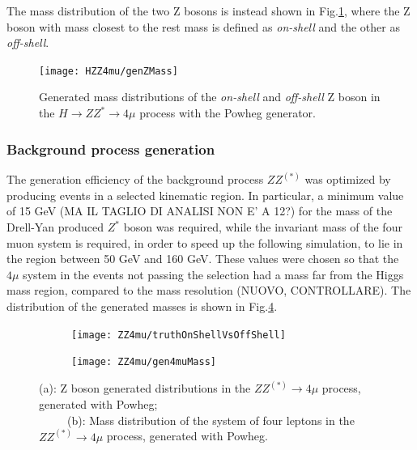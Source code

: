\documentclass[a4paper,twoside,12pt]{article}
\begin{document}
The mass distribution of the two Z bosons is instead shown in Fig.\ref{fig:HZZ4mu:generatedZMass}, where the Z boson with mass closest to the rest mass
is defined as \textit{on-shell} and the other as \textit{off-shell}.

\begin{figure}
\centering
  \texttt{[image: HZZ4mu/genZMass]}
  \caption{Generated mass distributions of the \textit{on-shell} and \textit{off-shell} Z boson 
  in the $H \rightarrow ZZ^* \rightarrow 4\mu$ process with the Powheg generator.}
\label{fig:HZZ4mu:generatedZMass}
\end{figure}

\subsubsection{Background process generation}\label{physics:bkgGeneration}
The generation efficiency of the background process $ZZ^{(*)}$ was optimized by
producing events in a selected kinematic region. In particular, a minimum value of 15 GeV (MA IL TAGLIO DI ANALISI NON E' A 12?) for the mass of
the Drell-Yan produced $Z^*$ boson was required, while the invariant mass of the four muon system is required,
in order to speed up the following simulation, 
to lie in the region between 50 GeV and 160 GeV. These values were chosen so that the $4\mu$ system in the events not passing the selection had a mass 
far from the Higgs mass region, compared to the mass resolution (NUOVO, CONTROLLARE). The distribution of the generated masses is shown 
in Fig.\ref{fig:ZZ4mu:genMasses}.\\

\begin{figure}
\begin{subfigure}{.5\linewidth}
\texttt{[image: ZZ4mu/truthOnShellVsOffShell]}
\caption{}
\label{fig:ZZ4mu:truthOnShellVsOffShell}
\end{subfigure}
\begin{subfigure}{.5\linewidth}
\centering
\texttt{[image: ZZ4mu/gen4muMass]}
\caption{}
\label{fig:ZZ4mu:gen4muMass}
\end{subfigure}
\caption{(a): Z boson generated distributions in the $ZZ^{(*)} \rightarrow 4\mu$ process, generated with Powheg;\\
\ \ \ \ \ (b): Mass distribution of the system of four leptons in the $ZZ^{(*)} \rightarrow 4\mu$ process, generated with Powheg.}
\label{fig:ZZ4mu:genMasses}
\end{figure}
\end{document}
